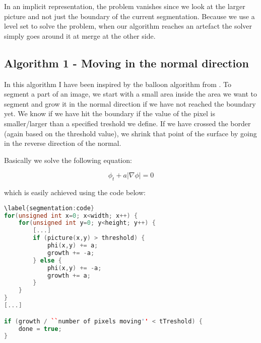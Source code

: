 In an implicit representation, the problem vanishes since we look at the larger picture and not just the boundary of the current segmentation. Because we use a level set to solve the problem, when our algorithm reaches an artefact the solver simply goes around it at merge at the other side.

\subsection{Algorithm 1 - Moving in the normal direction}
\label{segmentation:sec:algorithm1}


\begin{comment}
Start med noget mere overordnet og gå derefter i detaljer.

Læs igennem så det ikke står spredt men samlet.

Indsæt afsnit hvor jeg går direkte i dybden og overvej at fjerne ligning 1.1

\end{comment}

In this algorithm I have been inspired by the balloon algorithm from . 
To segment a part of an image, we start with a small area inside the area we want to segment and grow it in the normal direction if we have not reached the boundary yet. We know if we have hit the boundary if the value of the pixel is smaller/larger than a specified treshold we define. If we have crossed the border (again based on the threshold value), we shrink that point of the surface by going in the reverse direction of the normal.



Basically we solve the following equation:

\begin{equation}
  \phi_{t} + a|\nabla{\phi}| = 0
\end{equation}

which is easily achieved using the code below: 

\begin{lstlisting}[language=c++]
\label{segmentation:code}
for(unsigned int x=0; x<width; x++) {
    for(unsigned int y=0; y<height; y++) {
        [...]
        if (picture(x,y) > threshold) {
            phi(x,y) += a;
            growth += -a;
        } else {
            phi(x,y) += -a;
            growth += a;
        }
    }
}
[...]

if (growth / ``number of pixels moving'' < tTreshold) {
    done = true;
}
\end{lstlisting}



